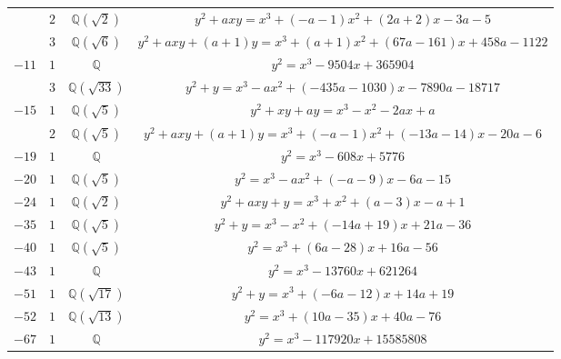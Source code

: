\documentclass[11pt]{amsart}
\newcommand{\eclabel}[1]{\href{https://www.lmfdb.org/EllipticCurve/Q/#1}{\texttt{#1}}}
\theoremstyle{definition}
\newcommand{\Q}{\mathbb Q}
\newcommand{\QQ}{\mathbb Q}
\begin{document}
{\begin{longtable}{|c|c|c|c|}
 \cline{2-4}
& $2$ &   $\Q(\sqrt{2})$ & \href{https://www.lmfdb.org/EllipticCurve/2.2.8.1/64.1/a/1}{$y^2 + axy = x^3 + (-a - 1)x^2 + (2a+2)x - 3a - 5$}\\
\cline{2-4}
& $3$ &   $\Q(\sqrt{6})$ & \href{https://www.lmfdb.org/EllipticCurve/2.2.24.1/1.1/a/3}{$y^2 + axy + (a + 1)y = x^3 + (a + 1)x^2 + (67a - 161)x + 458a - 1122$}\\
\hline
{$-11$} & $1$ & $\QQ$ & \href{https://www.lmfdb.org/EllipticCurve/Q/121/b/2}{$y^2=x^3-9504x+365904$}\\ %
  \cline{2-4}
 & $3$ &   $\Q(\sqrt{33})$ & \href{https://www.lmfdb.org/EllipticCurve/2.2.33.1/1.1/a/1}{$y^2 + y = x^3 - ax^2 + (-435a - 1030)x -7890a -18717$}\\
\hline
{$-15$} & $1$ &   $\Q(\sqrt{5})$ & \href{https://www.lmfdb.org/EllipticCurve/2.2.5.1/81.1/a/1}{$y^2 + xy + a y = x^3 - x^2 - 2 a x + a$}\\
\cline{2-4}
& $2$ &   $\Q(\sqrt{5})$ & \href{https://www.lmfdb.org/EllipticCurve/2.2.5.1/81.1/a/5}{$y^2 + axy + (a + 1)y = x^3 + (-a - 1)x^2 + (-13a - 14)x - 20a - 6$} \\
\hline
 $-19$ & $1$ & $\QQ$ & \href{https://www.lmfdb.org/EllipticCurve/Q/361/a/2}{$y^2=x^3-608x+5776$}\\ %
   \hline %
$-20$ & $1$ & $\QQ(\sqrt{5})$ & \href{https://www.lmfdb.org/EllipticCurve/2.2.5.1/4096.1/k/1}{$y^2 = x^3 - ax^2 + (-a - 9)x -6a - 15$}\\ 
\hline
$-24$ & $1$ &   $\Q(\sqrt{2})$ & \href{https://www.lmfdb.org/EllipticCurve/2.2.8.1/81.1/b/1}{$y^2 + axy + y = x^3 + x^2 + (a-3)x - a + 1$}\\
\hline
$-35$ & $1$ &   $\Q(\sqrt{5})$ & \href{https://www.lmfdb.org/EllipticCurve/2.2.5.1/2401.1/b/1}{$y^2 + y = x^3 - x^2 + (-14a + 19)x + 21a - 36$}\\
\hline
$-40$ & $1$ &   $\Q(\sqrt{5})$ &{$y^2 = x^3 + (6a - 28)x + 16a - 56$}\\
\hline
 $-43$ & $1$ & $\QQ$ & \href{https://www.lmfdb.org/EllipticCurve/Q/1849/b/2}{$y^2=x^3-13760x+621264$}\\ %
 \hline
$-51$ & $1$ &   $\Q(\sqrt{17})$ & \href{https://www.lmfdb.org/EllipticCurve/2.2.17.1/81.1/b/1}{$y^2 + y = x^3 + (-6a - 12)x + 14a + 19$}\\
\hline
$-52$ & $1$ &   $\Q(\sqrt{13})$ &{$ y^2 = x^3 + (10a - 35)x + 40a - 76$}\\
\hline
$-67$ & $1$ & $\QQ$ & \href{https://www.lmfdb.org/EllipticCurve/Q/4489/b/2}{$y^2=x^3-117920x+15585808$}\\ %

\end{longtable}}
\end{document}
